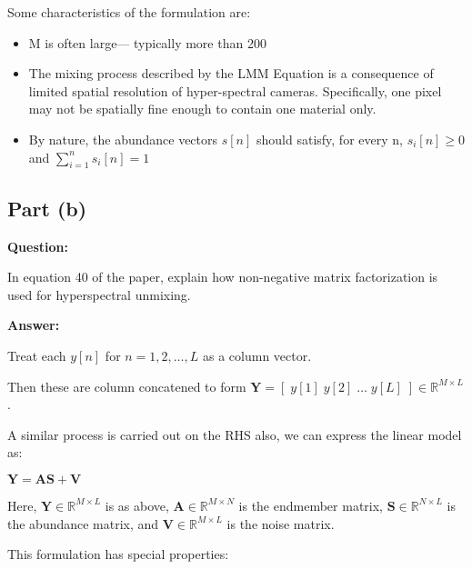 \documentclass[fleqn, 11pt]{article}
\newcommand{\bs}[1]{\boldsymbol{#1}}
\newcommand{\R}[0]{\mathbb{R}}
\begin{document}
Some characteristics of the formulation are:

\begin{itemize}
    \item M is often large— typically more than 200
    \item The mixing process described by the LMM Equation is a consequence of limited spatial resolution of          hyper-spectral cameras. Specifically, one pixel may not be spatially fine enough to contain one material      only.
    \item By nature, the abundance vectors $s[n]$ should satisfy, for every n,  $s_i[n] \geq 0$ and $\sum_{i=1}^n s_i[n]=1$
\end{itemize}

\bigskip

\subsection*{Part (b)}

\textbf{Question: }

\smallskip

In equation 40 of the paper, explain how non-negative matrix factorization is used for hyperspectral
unmixing.

\hrulefill

\medskip

\textbf{Answer: }

\smallskip

Treat each $y[n]$ for $n= 1,2,\ldots, L$  as a column vector. 

\smallskip

Then these are column concatened to form 
$\bs{Y}=[ \; y[1] \; y[2] \; \ldots \; y[L] \; ] \in \R^{M \times L}$.

\smallskip

A similar process is carried out on the RHS also, we can express the linear model as:

\begin{center}
    $\bs{Y=AS+V}$
\end{center}

Here, $\bs{Y} \in \R^{M \times L} $ is as above, 
$\bs{A} \in \R^{M \times N}$ is the endmember matrix, 
$\bs{S} \in \R^{N \times L}$ is the abundance matrix,  and 
$\bs{V} \in \R^{M \times L}$ is the noise matrix. 

\medskip

This formulation has special properties: 

\smallskip
\end{document}
